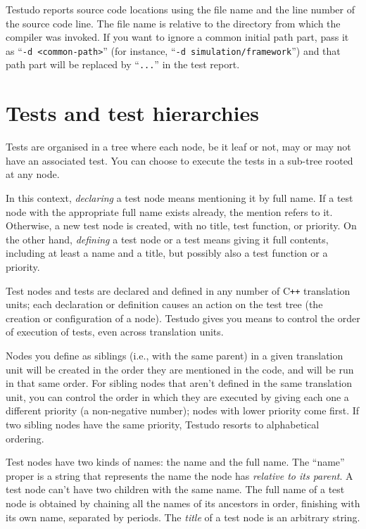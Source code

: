 \documentclass[twoside, a4paper, article]{memoir}
\newcommand*\Cpp{C\texttt{++}}
\begin{document}
Testudo reports source code locations using the file name and the line number
of the source code line.  The file name is relative to the directory from which
the compiler was invoked.  If you want to ignore a common initial path part,
pass it as ``\texttt{-d <common-path>}'' (for instance, ``\texttt{-d
  simulation/framework}'') and that path part will be replaced by
``\texttt{...}''  in the test report.


\chapter{Tests and test hierarchies}
\label{cha:tests-test-hierarchies}

Tests are organised in a tree where each node, be it leaf or not, may or may
not have an associated test.  You can choose to execute the tests in a sub-tree
rooted at any node.

In this context, \emph{declaring} a test node means mentioning it by full name.
If a test node with the appropriate full name exists already, the mention
refers to it.  Otherwise, a new test node is created, with no title, test
function, or priority.  On the other hand, \emph{defining} a test node or a
test means giving it full contents, including at least a name and a title, but
possibly also a test function or a priority.

Test nodes and tests are declared and defined in any number of \Cpp{}
translation units; each declaration or definition causes an action on the test
tree (the creation or configuration of a node).  Testudo gives you means to
control the order of execution of tests, even across translation units.

Nodes you define as siblings (i.e., with the same parent) in a given
translation unit will be created in the order they are mentioned in the code,
and will be run in that same order.  For sibling nodes that aren't defined in
the same translation unit, you can control the order in which they are executed
by giving each one a different priority (a non-negative number); nodes with
lower priority come first.  If two sibling nodes have the same priority,
Testudo resorts to alphabetical ordering.

Test nodes have two kinds of names: the name and the full name.  The ``name''
proper is a string that represents the name the node has \emph{relative to its
  parent}.  A test node can't have two children with the same name.  The full
name of a test node is obtained by chaining all the names of its ancestors in
order, finishing with its own name, separated by periods.  The \emph{title} of
a test node is an arbitrary string.
\end{document}
